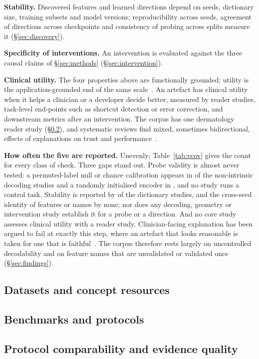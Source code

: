\textbf{Stability.} Discovered features and learned directions depend on seeds, dictionary size, training
subsets and model versions; reproducibility across seeds, agreement of directions across checkpoints and
consistency of probing across splits measure it (\S\ref{sec:discovery}).

\textbf{Specificity of interventions.} An intervention is evaluated against the three causal claims of
\S\ref{sec:methods} (\S\ref{sec:intervention}).

\textbf{Clinical utility.} The four properties above are functionally grounded; utility is the
application-grounded end of the same scale~\cite{doshivelez2017towards}. An artefact has clinical utility
when it helps a clinician or a developer decide better, measured by reader studies, task-level end-points
such as shortcut detection or error correction, and downstream metrics after an intervention. The corpus
has one dermatology reader study (\S\ref{sec:eval-bench}), and systematic reviews find mixed, sometimes
bidirectional, effects of explanations on trust and performance~\cite{rosenbacke2024how}.

\textbf{How often the five are reported.} Unevenly; Table~\ref{tab:vcov} gives the count for every class
of check. Three gaps stand out. Probe validity is almost never tested: a permuted-label null or chance
calibration appears in \Nprobectrl{} of the \Ndecni{} non-intrinsic decoding studies and a randomly
initialised encoder in \Nproberand{}, and no study runs a control task. Stability is reported by
\Nsaestab{} of the \Nsae{} dictionary studies, and the cross-seed identity of features or names by none;
nor does any decoding, geometry or intervention study establish it for a probe or a direction. And no
core study assesses clinical utility with a reader study. Clinician-facing explanation has been argued to
fail at exactly this step, where an artefact that looks reasonable is taken for one that is
faithful~\cite{ghassemi2021falsehope}. The corpus therefore rests largely on uncontrolled decodability
and on feature names that are unvalidated or validated once (\S\ref{sec:findings}).

\subsection{Datasets and concept resources}
\label{sec:eval-data}



\subsection{Benchmarks and protocols}
\label{sec:eval-bench}



\subsection{Protocol comparability and evidence quality}
\label{sec:eval-compare}



